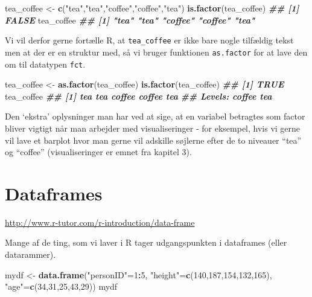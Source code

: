 \documentclass[
]{book}
\newenvironment{Shaded}{\begin{snugshade}}{\end{snugshade}}
\newcommand{\DecValTok}[1]{\textcolor[rgb]{0.00,0.00,0.81}{#1}}
\newcommand{\DocumentationTok}[1]{\textcolor[rgb]{0.56,0.35,0.01}{\textbf{\textit{#1}}}}
\newcommand{\FunctionTok}[1]{\textcolor[rgb]{0.13,0.29,0.53}{\textbf{#1}}}
\newcommand{\NormalTok}[1]{#1}
\newcommand{\OtherTok}[1]{\textcolor[rgb]{0.56,0.35,0.01}{#1}}
\newcommand{\SpecialCharTok}[1]{\textcolor[rgb]{0.81,0.36,0.00}{\textbf{#1}}}
\newcommand{\StringTok}[1]{\textcolor[rgb]{0.31,0.60,0.02}{#1}}
\begin{document}
\begin{Shaded}
\begin{Highlighting}[]
\NormalTok{tea\_coffee }\OtherTok{\textless{}{-}} \FunctionTok{c}\NormalTok{(}\StringTok{"tea"}\NormalTok{,}\StringTok{"tea"}\NormalTok{,}\StringTok{"coffee"}\NormalTok{,}\StringTok{"coffee"}\NormalTok{,}\StringTok{"tea"}\NormalTok{)}
\FunctionTok{is.factor}\NormalTok{(tea\_coffee)}
\DocumentationTok{\#\# [1] FALSE}
\NormalTok{tea\_coffee}
\DocumentationTok{\#\# [1] "tea"    "tea"    "coffee" "coffee" "tea"}
\end{Highlighting}
\end{Shaded}

Vi vil derfor gerne fortælle R, at \texttt{tea\_coffee} er ikke bare nogle tilfældig tekst men at der er en struktur med, så vi bruger funktionen \texttt{as.factor} for at lave den om til datatypen \texttt{fct}.

\begin{Shaded}
\begin{Highlighting}[]
\NormalTok{tea\_coffee }\OtherTok{\textless{}{-}} \FunctionTok{as.factor}\NormalTok{(tea\_coffee)}
\FunctionTok{is.factor}\NormalTok{(tea\_coffee)}
\DocumentationTok{\#\# [1] TRUE}
\NormalTok{tea\_coffee}
\DocumentationTok{\#\# [1] tea    tea    coffee coffee tea   }
\DocumentationTok{\#\# Levels: coffee tea}
\end{Highlighting}
\end{Shaded}

Den `ekstra' oplysninger man har ved at sige, at en variabel betragtes som factor bliver vigtigt når man arbejder med visualiseringer - for eksempel, hvis vi gerne vil lave et barplot hvor man gerne vil adskille søjlerne efter de to niveauer ``tea'' og ``coffee'' (visualiseringer er emnet fra kapitel 3).

\section{Dataframes}\label{dataframes}

\url{http://www.r-tutor.com/r-introduction/data-frame}

Mange af de ting, som vi laver i R tager udgangspunkten i dataframes (eller datarammer).

\begin{Shaded}
\begin{Highlighting}[]
\NormalTok{mydf }\OtherTok{\textless{}{-}} \FunctionTok{data.frame}\NormalTok{(}\StringTok{"personID"}\OtherTok{=}\DecValTok{1}\SpecialCharTok{:}\DecValTok{5}\NormalTok{, }\StringTok{"height"}\OtherTok{=}\FunctionTok{c}\NormalTok{(}\DecValTok{140}\NormalTok{,}\DecValTok{187}\NormalTok{,}\DecValTok{154}\NormalTok{,}\DecValTok{132}\NormalTok{,}\DecValTok{165}\NormalTok{), }\StringTok{"age"}\OtherTok{=}\FunctionTok{c}\NormalTok{(}\DecValTok{34}\NormalTok{,}\DecValTok{31}\NormalTok{,}\DecValTok{25}\NormalTok{,}\DecValTok{43}\NormalTok{,}\DecValTok{29}\NormalTok{))}
\NormalTok{mydf}
\end{Highlighting}
\end{Shaded}
\end{document}
